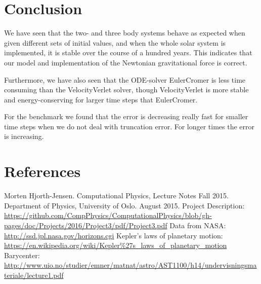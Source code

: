 \documentclass[norsk,a4paper,12pt]{article}
\begin{document}
{\section{Conclusion}
We have seen that the two- and three body systems behave as expected when given different sets of initial values, and when the whole solar system is implemented, it is stable over the course of a hundred years. This indicates that our model and implementation of the Newtonian gravitational force is correct. \par 
Furthermore, we have also seen that the ODE-solver EulerCromer is less time consuming than the VelocityVerlet solver, though VelocityVerlet is more stable and energy-conserving for larger time steps that EulerCromer.

For the benchmark we found that the error is decreasing really fast for smaller time steps when we do not deal with truncation error. For longer times the error is increasing.
\section{References}
\begingroup
\renewcommand{\section}[2]{}
\begin{thebibliography}{}
  Morten Hjorth-Jensen.
  Computational Physics, Lecture Notes Fall 2015.
  Department of Physics, University of Oslo.
  August 2015.
  Project Description:\newline
  \url{https://github.com/CompPhysics/ComputationalPhysics/blob/gh-pages/doc/Projects/2016/Project3/pdf/Project3.pdf}
  Data from NASA:\newline
  \url{http://ssd.jpl.nasa.gov/horizons.cgi}
  Kepler's laws of planetary motion:\newline
  \url{https://en.wikipedia.org/wiki/Kepler\%27s_laws_of_planetary_motion}
  Barycenter:\newline
  \url{http://www.uio.no/studier/emner/matnat/astro/AST1100/h14/undervisningsmateriale/lecture1.pdf}
\end{thebibliography}
\endgroup
\end{document}
